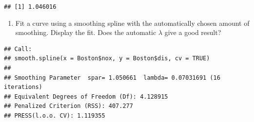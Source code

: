 \documentclass[]{article}
\newenvironment{Shaded}{\begin{snugshade}}{\end{snugshade}}
\newcommand{\DataTypeTok}[1]{\textcolor[rgb]{0.13,0.29,0.53}{#1}}
\newcommand{\KeywordTok}[1]{\textcolor[rgb]{0.13,0.29,0.53}{\textbf{#1}}}
\newcommand{\NormalTok}[1]{#1}
\newcommand{\OperatorTok}[1]{\textcolor[rgb]{0.81,0.36,0.00}{\textbf{#1}}}
\newcommand{\OtherTok}[1]{\textcolor[rgb]{0.56,0.35,0.01}{#1}}
\newcommand{\StringTok}[1]{\textcolor[rgb]{0.31,0.60,0.02}{#1}}
\providecommand{\tightlist}{%
  \setlength{\itemsep}{0pt}\setlength{\parskip}{0pt}}
\begin{document}
\begin{verbatim}
## [1] 1.046016
\end{verbatim}

\begin{enumerate}
\def\labelenumi{(\alph{enumi})}
\setcounter{enumi}{5}
\tightlist
\item
  Fit a curve using a smoothing spline with the automatically chosen
  amount of smoothing. Display the fit. Does the automatic \(\lambda\)
  give a good result?
\end{enumerate}

\begin{Shaded}
\end{Shaded}

\begin{verbatim}
## Call:
## smooth.spline(x = Boston$nox, y = Boston$dis, cv = TRUE)
## 
## Smoothing Parameter  spar= 1.050661  lambda= 0.07031691 (16 iterations)
## Equivalent Degrees of Freedom (Df): 4.128915
## Penalized Criterion (RSS): 407.277
## PRESS(l.o.o. CV): 1.119355
\end{verbatim}

\begin{Shaded}
\end{Shaded}
\end{document}
